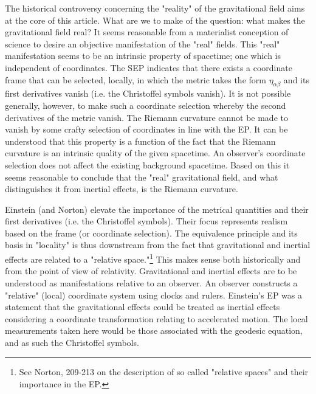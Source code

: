 \documentclass[11pt]{article}
\begin{document}
The historical controversy concerning the "reality" of the gravitational field aims at the core of this article. What are we to make of the question: what makes the gravitational field real? It seems reasonable from a materialist conception of science to desire an objective manifestation of the "real" fields. This "real" manifestation seems to be an intrinsic property of spacetime; one which is independent of coordinates. The SEP indicates that there exists a coordinate frame that can be selected, locally, in which the metric takes the form $\eta_{\alpha \beta}$ and its first derivatives vanish (i.e. the Christoffel symbols vanish). It is not possible generally, however, to make such a coordinate selection whereby the second derivatives of the metric vanish. The Riemann curvature cannot be made to vanish by some crafty selection of coordinates in line with the EP. It can be understood that this property is a function of the fact that the Riemann curvature is an intrinsic quality of the given spacetime. An observer’s coordinate selection does not affect the existing background spacetime. Based on this it seems reasonable to conclude that the "real" gravitational field, and what distinguishes it from inertial effects, is the Riemann curvature.

Einstein (and Norton) elevate the importance of the metrical quantities and their first derivatives (i.e. the Christoffel symbols). Their focus represents realism based on the frame (or coordinate selection). The equivalence principle and its basis in "locality" is thus downstream from the fact that gravitational and inertial effects are related to a "relative space."\footnote{See Norton, 209-213 on the description of so called "relative spaces" and their importance in the EP.} This makes sense both historically and from the point of view of relativity. Gravitational and inertial effects are to be understood as manifestations relative to an observer. An observer constructs a "relative" (local) coordinate system using clocks and rulers. Einstein's EP was a statement that the gravitational effects could be treated as inertial effects considering a coordinate transformation relating to accelerated motion. The local measurements taken here would be those associated with the geodesic equation, and as such the Christoffel symbols.
\end{document}
